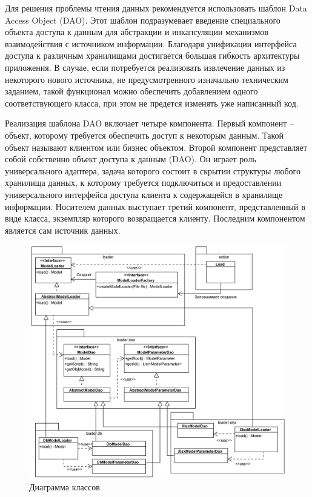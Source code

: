 \documentclass[14pt,oneside,final]{extreport}
\begin{document}
	Для решения проблемы чтения данных рекомендуется \cite{web:J2EEPatterns} использовать шаблон Data Access Object (DAO). Этот шаблон подразумевает  введение специального объекта доступа к данным для абстракции и инкапсуляции механизмов взаимодействия с источником информации. Благодаря унификации интерфейса доступа к различным хранилищами достигается большая гибкость архитектуры приложения. В случае, если потребуется реализовать извлечение данных из некоторого нового источника, не предусмотренного изначально техническим заданием, такой функционал можно обеспечить добавлением одного соответствующего класса, при этом не предется изменять уже написанный код.   
	
	Реализация шаблона DAO включает  четыре компонента. Первый компонент -- объект, которому требуется обеспечить доступ к некоторым данным. Такой объект называют клиентом или бизнес объектом. Второй компонент представляет собой собственно объект доступа к данным (DAO). Он играет роль универсального адаптера, задача которого состоит в скрытии структуры любого хранилища данных, к которому требуется подключиться и предоставлении универсального интерфейса доступа клиента к содержащейся в хранилище информации. Носителем данных выступает третий компонент, представленный в виде класса, экземпляр которого возвращается клиенту. Последним компонентом является  сам источник данных.  
	
	\begin{figure}[!h]
		\begin{center}
			\includegraphics[scale=0.15]{img/class-diagram} 
		\end{center}
		\caption{Диаграмма классов}
		\label{fig:class-diagram}
	\end{figure}
	
\end{document}
